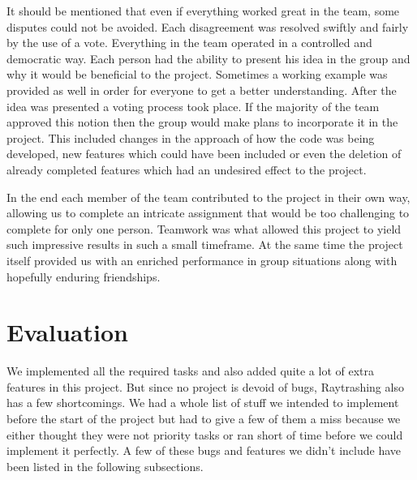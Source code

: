 \documentclass[10pt]{scrartcl}
\begin{document}
It should be mentioned that even if everything worked great in the team, some disputes could not be avoided. Each disagreement was resolved swiftly and fairly by the use of a vote. Everything in the team operated in a controlled and democratic way. Each person had the ability to present his idea in the group and why it would be beneficial to the project. Sometimes a working example was provided as well in order for everyone to get a better understanding. After the idea was presented a voting process took place. If the majority of the team approved this notion then the group would make plans to incorporate it in the project. This included changes in the approach of how the code was being developed, new features which could have been included or even the deletion of already completed features which had an undesired effect to the project. \par
In the end each member of the team contributed to the project in their own way, allowing us to complete an intricate assignment that would be too challenging to complete for only one person.  Teamwork was what allowed this project to yield such impressive results in such a small timeframe. At the same time the project itself provided us with an enriched performance in group situations along with hopefully enduring friendships.\par

\section{Evaluation}
We implemented all the required tasks and also added quite a lot of extra features in this project. But since no project is devoid of bugs, Raytrashing also has a few shortcomings. We had a whole list of stuff we intended to implement before the start of the project but had to give a few of them a miss because we either thought they were not priority tasks or ran short of time before we could implement it perfectly. A few of these bugs and features we didn't include have been listed in the following subsections.
\end{document}
